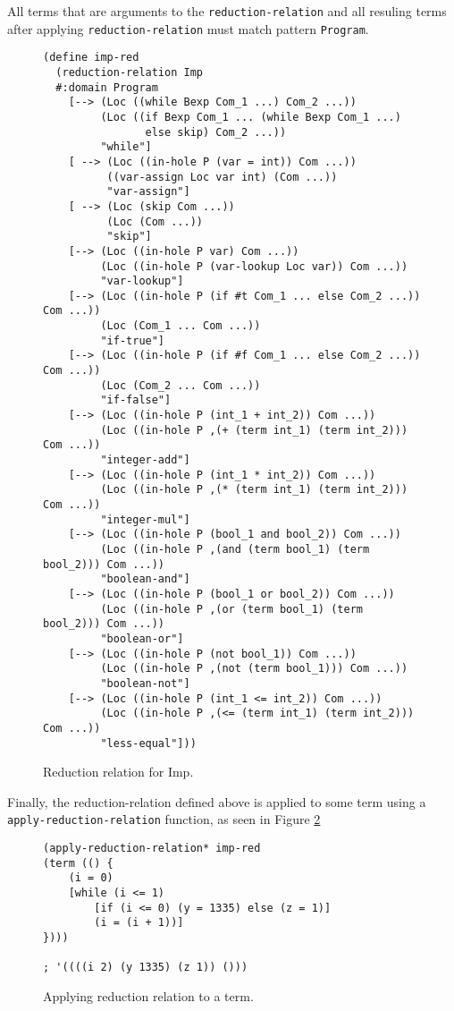 All terms that are arguments to the \texttt{reduction-relation} and all resuling terms after applying \texttt{reduction-relation} must match pattern \texttt{Program}.

\begin{figure}[ht]
\begin{verbatim}
(define imp-red 
  (reduction-relation Imp
  #:domain Program 
    [--> (Loc ((while Bexp Com_1 ...) Com_2 ...))
         (Loc ((if Bexp Com_1 ... (while Bexp Com_1 ...) 
                else skip) Com_2 ...))
         "while"]
    [ --> (Loc ((in-hole P (var = int)) Com ...))
          ((var-assign Loc var int) (Com ...))
          "var-assign"]
    [ --> (Loc (skip Com ...))
          (Loc (Com ...))
          "skip"]
    [--> (Loc ((in-hole P var) Com ...))
         (Loc ((in-hole P (var-lookup Loc var)) Com ...))
         "var-lookup"]
    [--> (Loc ((in-hole P (if #t Com_1 ... else Com_2 ...)) Com ...))
         (Loc (Com_1 ... Com ...))
         "if-true"]
    [--> (Loc ((in-hole P (if #f Com_1 ... else Com_2 ...)) Com ...))
         (Loc (Com_2 ... Com ...))
         "if-false"]
    [--> (Loc ((in-hole P (int_1 + int_2)) Com ...))
         (Loc ((in-hole P ,(+ (term int_1) (term int_2))) Com ...))
         "integer-add"]
    [--> (Loc ((in-hole P (int_1 * int_2)) Com ...))
         (Loc ((in-hole P ,(* (term int_1) (term int_2))) Com ...))
         "integer-mul"]
    [--> (Loc ((in-hole P (bool_1 and bool_2)) Com ...))
         (Loc ((in-hole P ,(and (term bool_1) (term bool_2))) Com ...))
         "boolean-and"]
    [--> (Loc ((in-hole P (bool_1 or bool_2)) Com ...))
         (Loc ((in-hole P ,(or (term bool_1) (term bool_2))) Com ...))
         "boolean-or"]
    [--> (Loc ((in-hole P (not bool_1)) Com ...))
         (Loc ((in-hole P ,(not (term bool_1))) Com ...))
         "boolean-not"]
    [--> (Loc ((in-hole P (int_1 <= int_2)) Com ...))
         (Loc ((in-hole P ,(<= (term int_1) (term int_2))) Com ...))
         "less-equal"]))
\end{verbatim}
\caption{Reduction relation for Imp.}
\label{imp-define-red}
\end{figure}

Finally, the reduction-relation defined above is applied to some term using a \newline \texttt{apply-reduction-relation} function, as seen in Figure \ref{imp-red-apply}

\begin{figure}[ht]
\begin{verbatim}
(apply-reduction-relation* imp-red 
(term (() {
	(i = 0)
	[while (i <= 1)
		[if (i <= 0) (y = 1335) else (z = 1)]
		(i = (i + 1))]
})))

; '((((i 2) (y 1335) (z 1)) ()))
\end{verbatim}
\caption{Applying reduction relation to a term.}
\label{imp-red-apply}
\end{figure}
